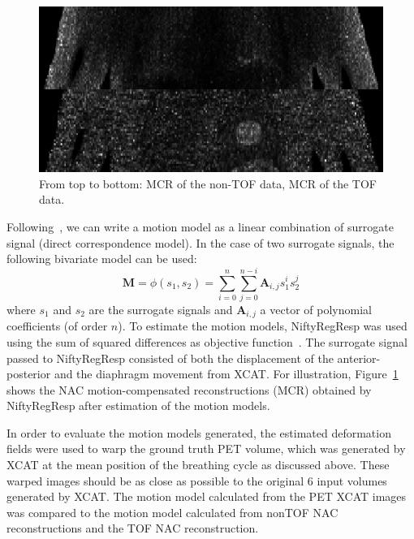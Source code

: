 \documentclass[9pt]{IEEEtran}
\begin{document}
\begin{figure}
    \centering
    \includegraphics[scale=0.3]{figures/mcr.png}
    \caption{From top to bottom: MCR of the non-TOF data, MCR of the TOF data.}
    \label{fig:mcr}
\end{figure}

Following~\cite{McClelland2013}, we can write a motion model as a linear combination of surrogate signal (direct correspondence model). In the case of two surrogate signals, the following bivariate model can be used:
\begin{equation}
    \bm{M} = \phi(s_1,s_2)=\sum_{i=0}^{n}\sum_{j=0}^{n-i}\bm{A}_{i,j}s_1^i s_2^j
\end{equation}
where $s_1$ and $s_2$ are the surrogate signals and $\bm{A}_{i,j}$ a vector of polynomial coefficients (of order $n$). 
To estimate the motion models, NiftyRegResp was used using the sum of squared differences as objective function~\cite{NiftyRegResp}. The surrogate signal passed to NiftyRegResp consisted of both the displacement of the anterior-posterior and the  diaphragm movement from XCAT. For illustration, Figure~\ref{fig:mcr} shows the NAC motion-compensated reconstructions (MCR) obtained by NiftyRegResp after estimation of the motion models.

In order to evaluate the motion models generated, the estimated deformation fields were used to warp the ground truth PET volume, which was generated by XCAT at the mean position of the breathing cycle as discussed above. These warped images should be as close as possible to the original 6 input volumes generated by XCAT. The motion model calculated from the PET XCAT images was compared to the motion model calculated from nonTOF NAC reconstructions and the TOF NAC reconstruction.  

\end{document}
